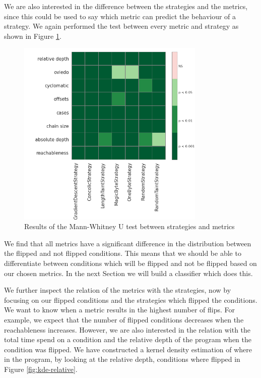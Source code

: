 We are also interested in the difference between the strategies and the metrics, since this could be used to say which metric can predict the behaviour of a strategy. We again performed the test between every metric and strategy as shown in Figure \ref{fig:mann-whitney-strategy-metrics}.
\begin{figure}[H]
    \centering
    \includegraphics[width=0.8\textwidth]{5_results/graphs_new/mann_whitney_u_strategy.png}  
    \caption{Results of the Mann-Whitney U test between strategies and metrics}
    \label{fig:mann-whitney-strategy-metrics}
\end{figure}
We find that all metrics have a significant difference in the distribution between the flipped and not flipped conditions. 
This means that we should be able to differentiate between conditions which will be flipped and not be flipped based on our chosen metrics. In the next Section we will build a classifier which does this.

We further inspect the relation of the metrics with the strategies, now by focusing on our flipped conditions and the strategies which flipped the conditions.
We want to know when a metric results in the highest number of flips. For example, we expect that the number of flipped conditions decreases when the reachableness increases. However, we are also interested in the relation with the total time spend on a condition and the relative depth of the program when the condition was flipped.
We have constructed a kernel density estimation of where in the program, by looking at the relative depth, conditions where flipped in Figure \ref{fig:kde-relative}.


